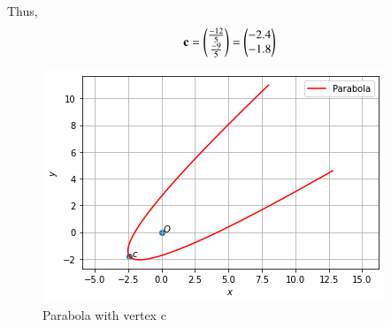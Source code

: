 \documentclass[journal,12pt,twocolumn]{IEEEtran}
\begin{document}
Thus,
\begin{align}
    \mathbf{c} = \begin{pmatrix}\frac{-12}{5}\\\frac{-9}{5}\end{pmatrix} = \begin{pmatrix}-2.4 \\ -1.8\end{pmatrix}
\end{align}
\renewcommand{\thefigure}{1}
\begin{figure}[h!]
    \centering
    \includegraphics[width=\columnwidth]{assignment5parabola.png}
    \caption{Parabola with vertex c}
    \label{fig:fig1}
\end{figure}
\end{document}
